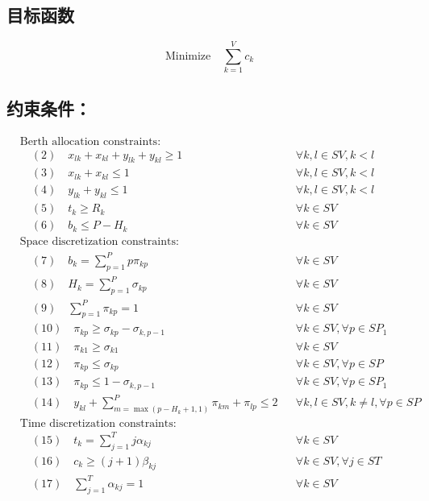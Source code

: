 \documentclass[11pt]{ctexart}
\begin{document}
\subsection*{目标函数}
\[\text{Minimize} \quad \sum_{k=1}^{V} c_k\]

\subsection*{约束条件：}
\begin{align*}
& \text{Berth allocation constraints:} \\
& \quad (2) \quad x_{lk} + x_{kl} + y_{lk} + y_{kl} \ge 1 && \forall k, l \in SV, k < l \\
& \quad (3) \quad x_{lk} + x_{kl} \le 1 && \forall k, l \in SV, k < l \\
& \quad (4) \quad y_{lk} + y_{kl} \le 1 && \forall k, l \in SV, k < l \\
& \quad (5) \quad t_k \ge R_k && \forall k \in SV \\
& \quad (6) \quad b_k \le P - H_k && \forall k \in SV \\
& \text{Space discretization constraints:} \\
& \quad (7) \quad b_k = \sum_{p=1}^{P} p \pi_{kp} && \forall k \in SV \\
& \quad (8) \quad H_k = \sum_{p=1}^{P} \sigma_{kp} && \forall k \in SV \\
& \quad (9) \quad \sum_{p=1}^{P} \pi_{kp} = 1 && \forall k \in SV \\
& \quad (10) \quad \pi_{kp} \ge \sigma_{kp} - \sigma_{k, p-1} && \forall k \in SV, \forall p \in SP_1 \\
& \quad (11) \quad \pi_{k1} \ge \sigma_{k1} && \forall k \in SV \\
& \quad (12) \quad \pi_{kp} \le \sigma_{kp} && \forall k \in SV, \forall p \in SP \\
& \quad (13) \quad \pi_{kp} \le 1 - \sigma_{k, p-1} && \forall k \in SV, \forall p \in SP_1 \\
& \quad (14) \quad y_{kl} + \sum_{m=\max(p-H_k+1,1)}^{P} \pi_{km} + \pi_{lp} \le 2 && \forall k, l \in SV, k \neq l, \forall p \in SP \\
& \text{Time discretization constraints:} \\
& \quad (15) \quad t_k = \sum_{j=1}^{T} j \alpha_{kj} && \forall k \in SV \\
& \quad (16) \quad c_k \ge (j+1) \beta_{kj} && \forall k \in SV, \forall j \in ST \\
& \quad (17) \quad \sum_{j=1}^{T} \alpha_{kj} = 1 && \forall k \in SV \\

\end{align*}
\end{document}
